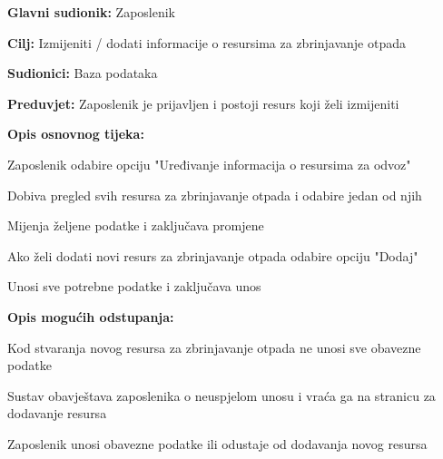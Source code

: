 				\noindent {}
				\begin{packed_item}
					
					\item \textbf{Glavni sudionik: }Zaposlenik
					\item  \textbf{Cilj:} Izmijeniti / dodati informacije o resursima za zbrinjavanje otpada
					\item  \textbf{Sudionici:} Baza podataka
					\item  \textbf{Preduvjet:} Zaposlenik je prijavljen i postoji resurs koji želi izmijeniti
					\item  \textbf{Opis osnovnog tijeka:}
					
					\item[] \begin{packed_enum}
						
						\item Zaposlenik odabire opciju "Uređivanje informacija o resursima za odvoz"
						\item Dobiva pregled svih resursa za zbrinjavanje otpada i odabire jedan od njih
						\item Mijenja željene podatke i zaključava promjene
						\item Ako želi dodati novi resurs za zbrinjavanje otpada odabire opciju "Dodaj"
						\item Unosi sve potrebne podatke i zaključava unos
					\end{packed_enum}
					
					\item  \textbf{Opis mogućih odstupanja:}
					
					\item[] \begin{packed_item}
						
						\item[2.a] Kod stvaranja novog resursa za zbrinjavanje otpada ne unosi sve obavezne podatke
						\item[] \begin{packed_enum}
							
							\item Sustav obavještava zaposlenika o neuspjelom unosu i vraća ga na stranicu za dodavanje resursa
							\item Zaposlenik unosi obavezne podatke ili odustaje od dodavanja novog resursa
							
						\end{packed_enum}
						
						
					\end{packed_item}
				\end{packed_item}
			
